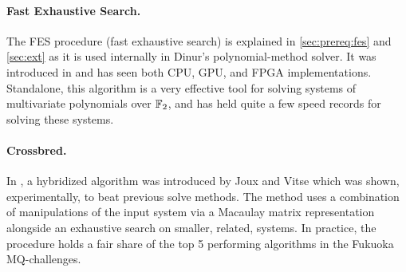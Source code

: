 \paragraph{Fast Exhaustive Search.} The FES procedure (fast exhaustive search) is explained in \cref{sec:prereq:fes} and \cref{sec:ext} as it is used internally in Dinur's polynomial-method solver. It was introduced in \cite{ches-2010-23990} and has seen both CPU, GPU, and FPGA implementations. Standalone, this algorithm is a very effective tool for solving systems of multivariate polynomials over $\mathbb{F}_2$, and has held quite a few speed records for solving these systems.

\paragraph{Crossbred.} In \cite{cryptoeprint:2017/372}, a hybridized algorithm was introduced by Joux and Vitse which was shown, experimentally, to beat previous solve methods. The method uses a combination of manipulations of the input system via a Macaulay matrix representation alongside an exhaustive search on smaller, related, systems. In practice, the procedure holds a fair share of the top 5 performing algorithms in the Fukuoka MQ-challenges.


\newpage
